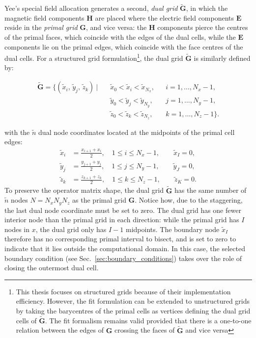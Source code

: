 Yee's special field allocation generates a second, \textit{dual grid} $\widetilde{\mathbf{G}}$, in which the magnetic field components $\mathbf{H}$ are placed where the electric field components $\mathbf{E}$ reside in the \textit{primal grid} $\mathbf{G}$, and vice versa: the $\mathbf{H}$ components pierce the centres of the primal faces, which coincide with the edges of the dual cells, while the $\mathbf{E}$ components lie on the primal edges, which coincide with the face centres of the dual cells. For a structured grid formulation\footnote{This thesis focuses on structured grids because of their implementation efficiency. However, the \gls{fit} formulation can be extended to unstructured grids by taking the barycentres of the primal cells as vertices defining the dual grid cells of $\widetilde{\mathbf{G}}$. The
\gls{fit} formalism remains valid provided that there is a one-to-one relation between the edges of $\mathbf{G}$ crossing the faces of
$\widetilde{\mathbf{G}}$ and vice versa}, the dual grid $\widetilde{\mathbf{G}}$ is similarly defined by:

\begin{equation}
\begin{aligned}
\widetilde{\mathbf{G}} = \bigl\{(\tilde{x}_i,\,\tilde{y}_j,\,\tilde{z}_k)\ \big|\quad
&\tilde{x}_0 < \tilde{x}_i < \tilde{x}_{N_x}, &&i = 1,\ldots,N_x-1,\\ &\tilde{y}_0 < \tilde{y}_j < \tilde{y}_{N_y}, &&j = 1,\ldots,N_y-1,\\ &\tilde{z}_0 < \tilde{z}_k < \tilde{z}_{N_z}, &&k = 1,\ldots,N_z-1
\bigr\}.
\end{aligned}
\end{equation}

with the $\tilde{n}$ dual node coordinates located at the midpoints of the primal cell edges:
\begin{align}
\tilde{x}_i &= \frac{x_{i+1}+x_i}{2}, \quad 1 \le i \le N_x-1,
\qquad \tilde{x}_I = 0, \\
\tilde{y}_j &= \frac{y_{j+1}+y_j}{2}, \quad 1 \le j \le N_y-1,
\qquad \tilde{y}_J = 0, \\
\tilde{z}_k &= \frac{z_{k+1}+z_k}{2}, \quad 1 \le k \le N_z-1,
\qquad \tilde{z}_K = 0.
\label{eq:dual_grid_truncation}
\end{align}
To preserve the operator matrix shape, the dual grid $\widetilde{\mathbf{G}}$ has the same number of $\tilde n$ nodes $N=N_xN_yN_z$ as the primal grid $\mathbf{G}$. Notice how, due to the staggering, the last dual node coordinate must be set to zero. The dual grid has one fewer interior node than the primal grid in each direction: while the primal grid has $I$ nodes in $x$, the dual grid only has $I-1$ midpoints. The boundary node $\tilde{x}_I$ therefore has no corresponding primal interval to bisect, and is set to zero to indicate that it lies outside the computational domain. In this case, the selected boundary condition (see Sec.~\ref{sec:boundary_conditions}) takes over the role of closing the outermost dual cell.

